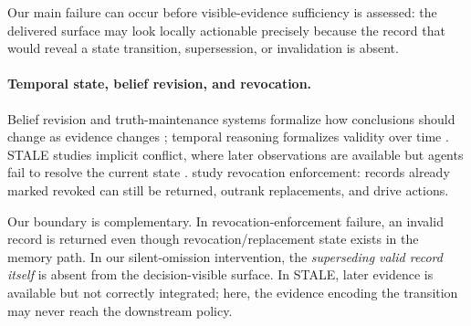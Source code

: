Our main failure can occur before visible-evidence sufficiency is assessed: the delivered
surface may look locally actionable precisely because the record that would reveal a state
transition, supersession, or invalidation is absent.

\paragraph{Temporal state, belief revision, and revocation.}
Belief revision and truth-maintenance systems formalize how conclusions should change as
evidence changes \citep{alchourron1985logic,doyle1979truth}; temporal reasoning formalizes
validity over time \citep{allen1983maintaining}. STALE studies implicit conflict, where
later observations are available but agents fail to resolve the current state
\citep{chao2026stale}. \citet{shen2026revoked} study revocation enforcement: records already
marked revoked can still be returned, outrank replacements, and drive actions.

Our boundary is complementary. In revocation-enforcement failure, an invalid record is
returned even though revocation/replacement state exists in the memory path. In our
silent-omission intervention, the \emph{superseding valid record itself} is absent from the
decision-visible surface. In STALE, later evidence is available but not correctly
integrated; here, the evidence encoding the transition may never reach the downstream
policy.

\begin{table}[t]
\centering
\small
\setlength{\tabcolsep}{4pt}
\caption{Functional boundary relative to the nearest contemporary work. The rows address
adjacent failure surfaces and are not intended as a performance ranking.}
\label{tab:nearest}
\end{table}
